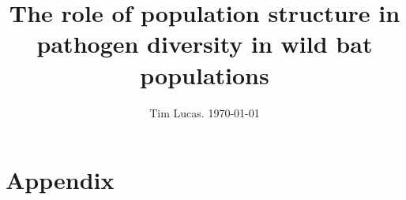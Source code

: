 \documentclass[a4paper,10pt,reqno]{amsart}
\begin{document}
\title{The role of population structure in pathogen diversity in wild bat populations}
\author{Tim Lucas. \today}
\date{}

\maketitle
\tableofcontents






\section{Appendix}



\small
\printbibliography 
\end{document}
